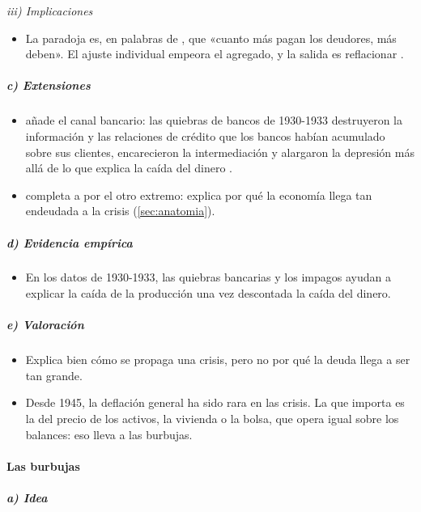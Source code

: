 \documentclass[11pt]{article}
\begin{document}
\hspace*{3.6em}\emph{iii) Implicaciones}

\begin{itemize}
\item La paradoja es, en palabras de , que «cuanto más pagan los deudores, más deben»\nocite{Fisher1933}. El ajuste individual empeora el agregado, y la salida es reflacionar .
\end{itemize}

\subparagraph{c) Extensiones}

\begin{itemize}
\item \textcite{Bernanke1983Nonmonetary} añade el canal bancario: las quiebras de bancos de 1930-1933 destruyeron la información y las relaciones de crédito que los bancos habían acumulado sobre sus clientes, encarecieron la intermediación y alargaron la depresión más allá de lo que explica la caída del dinero .
\item {} completa a  por el otro extremo: explica por qué la economía llega tan endeudada a la crisis (\ref{sec:anatomia}).
\end{itemize}

\subparagraph{d) Evidencia empírica}

\begin{itemize}
\item En los datos de 1930-1933, las quiebras bancarias y los impagos ayudan a explicar la caída de la producción una vez descontada la caída del dinero\nocite{Bernanke1983Nonmonetary}.
\end{itemize}

\subparagraph{e) Valoración}

\begin{itemize}
\item Explica bien cómo se propaga una crisis, pero no por qué la deuda llega a ser tan grande.
\item Desde 1945, la deflación general ha sido rara en las crisis. La que importa es la del precio de los activos, la vivienda o la bolsa, que opera igual sobre los balances: eso lleva a las burbujas.
\end{itemize}

\paragraph{Las burbujas}

\subparagraph{a) Idea}
\end{document}
